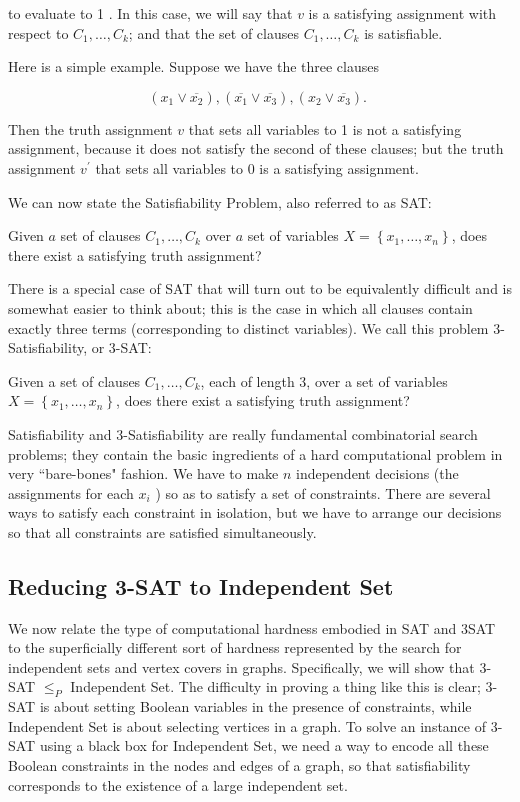 \documentclass[a4paper, 12pt]{book}
\theoremstyle{dotless}
\begin{document}
to evaluate to 1 . In this case, we will say that $v$ is a satisfying assignment with respect to $C_{1}, \ldots, C_{k}$; and that the set of clauses $C_{1}, \ldots, C_{k}$ is satisfiable.

Here is a simple example. Suppose we have the three clauses

$$
\left(x_{1} \vee \overline{x_{2}}\right),\left(\overline{x_{1}} \vee \overline{x_{3}}\right),\left(x_{2} \vee \overline{x_{3}}\right) \text {. }
$$

Then the truth assignment $v$ that sets all variables to 1 is not a satisfying assignment, because it does not satisfy the second of these clauses; but the truth assignment $v^{\prime}$ that sets all variables to 0 is a satisfying assignment.

We can now state the Satisfiability Problem, also referred to as SAT:

Given $a$ set of clauses $C_{1}, \ldots, C_{k}$ over $a$ set of variables $X=\left\{x_{1}, \ldots, x_{n}\right\}$, does there exist a satisfying truth assignment?

There is a special case of SAT that will turn out to be equivalently difficult and is somewhat easier to think about; this is the case in which all clauses contain exactly three terms (corresponding to distinct variables). We call this problem 3-Satisfiability, or 3-SAT:

Given a set of clauses $C_{1}, \ldots, C_{k}$, each of length 3, over a set of variables $X=\left\{x_{1}, \ldots, x_{n}\right\}$, does there exist a satisfying truth assignment?

Satisfiability and 3-Satisfiability are really fundamental combinatorial search problems; they contain the basic ingredients of a hard computational problem in very ``bare-bones" fashion. We have to make $n$ independent decisions (the assignments for each $x_{i}$ ) so as to satisfy a set of constraints. There are several ways to satisfy each constraint in isolation, but we have to arrange our decisions so that all constraints are satisfied simultaneously.

\subsection{Reducing 3-SAT to Independent Set}
We now relate the type of computational hardness embodied in SAT and 3SAT to the superficially different sort of hardness represented by the search for independent sets and vertex covers in graphs. Specifically, we will show that 3-SAT $\leq_{P}$ Independent Set. The difficulty in proving a thing like this is clear; 3-SAT is about setting Boolean variables in the presence of constraints, while Independent Set is about selecting vertices in a graph. To solve an instance of 3-SAT using a black box for Independent Set, we need a way to encode all these Boolean constraints in the nodes and edges of a graph, so that satisfiability corresponds to the existence of a large independent set.
\end{document}
